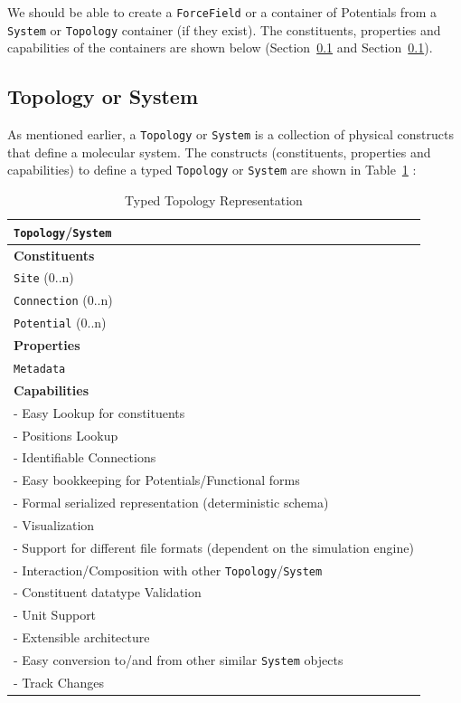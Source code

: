 \documentclass[12pt]{article}
\begin{document}
We should be able to create a \texttt{ForceField} or a container of Potentials from a \texttt{System} or \texttt{Topology} container (if they exist). The constituents, properties and capabilities of the containers are shown below (Section~\ref{def:Topology} and Section~\ref{def:Topology}).

\subsection{Topology or System}
\label{def:Topology}
As mentioned earlier, a \texttt{Topology} or \texttt{System} is a collection of physical constructs that define a molecular system. The constructs (constituents, properties and capabilities) to define a typed \texttt{Topology} or \texttt{System} are shown in  Table~\ref{tab:TopologySpec} :

\begin{table}[ht]
    \centering
     \caption{Typed Topology Representation}
    \begin{tabular}{|l|}
         \hline
         \rowcolor{gray!50}
         \texttt{Topology}/\texttt{System}  \\
         \hline
         \textbf{Constituents} \\
         \texttt{Site} (0..n) \\
         \texttt{Connection} (0..n)\\
         \texttt{Potential} (0..n)\\
         \hline
         \textbf{Properties}\\
         \texttt{Metadata} \\
         \hline
         \textbf{Capabilities}\\
         \hline
         - Easy Lookup for constituents \\
         - Positions Lookup \\
         - Identifiable Connections \\
         - Easy bookkeeping for Potentials/Functional forms \\
         - Formal serialized representation (deterministic schema) \\
         - Visualization \\
         - Support for different file formats (dependent on the simulation engine) \\
         - Interaction/Composition with other \texttt{Topology}/\texttt{System}\\
         - Constituent datatype Validation \\
         - Unit Support \\
         - Extensible architecture \\
         - Easy conversion to/and from other similar \texttt{System} objects\\
         - Track Changes \\

        \hline

    \end{tabular}
    \label{tab:TopologySpec}
\end{table}
\end{document}
